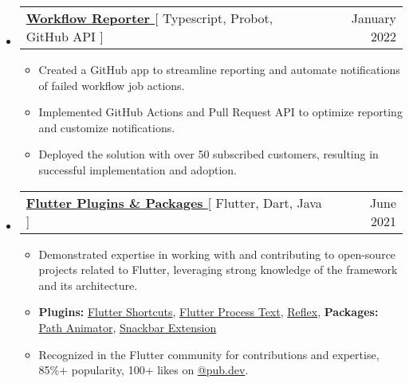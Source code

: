 \documentclass[letterpaper,11pt]{article}
\makeatletter
\newcommand{\resumeItem}[1]{
  \item\small{
    {#1 \vspace{-2pt}}
  }
}
\newcommand{\resumeProjectHeading}[2]{
    \item
    \begin{tabular*}{0.97\textwidth}{l@{\extracolsep{\fill}}r}
      \small#1 & #2 \\
    \end{tabular*}\vspace{-7pt}
}
\newcommand{\resumeSubHeadingListStart}{\begin{itemize}[leftmargin=0.15in, label={}]}
\newcommand{\resumeSubHeadingListEnd}{\end{itemize}}
\newcommand{\resumeItemListStart}{\begin{itemize}}
\newcommand{\resumeItemListEnd}{\end{itemize}\vspace{-5pt}}
\makeatother
\begin{document}
    \resumeSubHeadingListStart
      \resumeProjectHeading
          {\textbf{\href{https://github.com/marketplace/workflow-reporter} {Workflow Reporter }}{[ Typescript, Probot, GitHub API ]}}{January 2022}
          \resumeItemListStart
           \resumeItem{Created a GitHub app to streamline reporting and automate notifications of failed workflow job actions.}
           \resumeItem{Implemented GitHub Actions and Pull Request API to optimize reporting and customize notifications.}
           \resumeItem{Deployed the solution with over 50 subscribed customers, resulting in successful implementation and adoption.}
          \resumeItemListEnd
    \resumeSubHeadingListEnd


    \resumeSubHeadingListStart
      \resumeProjectHeading
          {\textbf{\href{https://github.com/DevsOnFlutter}{Flutter Plugins \& Packages }}{[ Flutter, Dart, Java ]}}{June 2021}
          \resumeItemListStart
          \resumeItem{Demonstrated expertise in working with and contributing to open-source projects related to Flutter, leveraging strong knowledge of the framework and its architecture.}
           \resumeItem{\textbf{Plugins:} \href{https://pub.dev/packages/flutter_shortcuts}{Flutter Shortcuts},
            \href{https://pub.dev/packages/flutter_process_text}{Flutter Process Text}, \href{https://pub.dev/packages/reflex}{Reflex},
            \textbf{Packages:}
            \href{https://pub.dev/packages/path_animator}{Path Animator}, \href{https://pub.dev/packages/snackbar_extension}{Snackbar Extension}}
           \resumeItem{Recognized in the Flutter community for contributions and expertise, 85\%+ popularity, 100+ likes on \href{https://pub.dev/packages}{@pub.dev}.}
          \resumeItemListEnd
    \resumeSubHeadingListEnd
    
    
\end{document}
